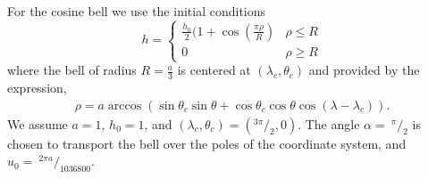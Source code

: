 For the cosine bell we use the initial conditions
\begin{equation*}
h  = 
\begin{cases} 
\frac{h_0}{2} (1 + \cos(\frac{\pi \rho}{R})  & \rho \le R  \\
 0 &  \rho \geq R 
\end{cases}
\end{equation*}
where the bell of radius $R = \frac{a}{3}$ is centered at $(\lambda_c, \theta_c)$ and provided by the expression,
\begin{eqnarray*}
\rho = a \arccos( \sin \theta_{c} \sin \theta + \cos \theta_{c} \cos \theta \cos (\lambda - \lambda_{c}) ).
\end{eqnarray*}
We assume $a = 1$, $h_0 = 1$, and $(\lambda_c, \theta_c) = (^{3\pi}/_{2}, 0)$. The angle $\alpha =\ ^{\pi}/_{2}$ is chosen to transport the bell over the poles of the coordinate system, and $u_0 =\ ^{2 \pi a}/_{1036800}$. 

